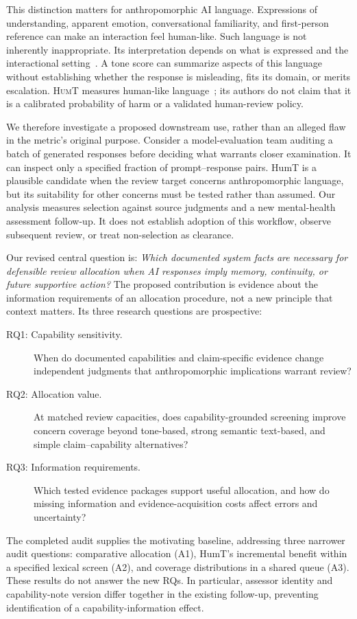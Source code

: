 \documentclass[manuscript,screen,review,anonymous]{acmart}
\newcommand{\HumT}{\textsc{HumT}}
\begin{document}
This distinction matters for anthropomorphic AI language. Expressions of understanding, apparent emotion, conversational familiarity, and first-person reference can make an interaction feel human-like. Such language is not inherently inappropriate. Its interpretation depends on what is expressed and the interactional setting~\cite{devrio2025taxonomy,cheng2025dehumanizing}. A tone score can summarize aspects of this language without establishing whether the response is misleading, fits its domain, or merits escalation. \HumT{} measures human-like language~\cite{cheng2025humt}; its authors do not claim that it is a calibrated probability of harm or a validated human-review policy.

We therefore investigate a proposed downstream use, rather than an alleged flaw in the metric's original purpose. Consider a model-evaluation team auditing a batch of generated responses before deciding what warrants closer examination. It can inspect only a specified fraction of prompt--response pairs. HumT is a plausible candidate when the review target concerns anthropomorphic language, but its suitability for other concerns must be tested rather than assumed. Our analysis measures selection against source judgments and a new mental-health assessment follow-up. It does not establish adoption of this workflow, observe subsequent review, or treat non-selection as clearance.

Our revised central question is: \emph{Which documented system facts are necessary for defensible review allocation when AI responses imply memory, continuity, or future supportive action?} The proposed contribution is evidence about the information requirements of an allocation procedure, not a new principle that context matters. Its three research questions are prospective:
\begin{description}
\item[RQ1: Capability sensitivity.] When do documented capabilities and claim-specific evidence change independent judgments that anthropomorphic implications warrant review?
\item[RQ2: Allocation value.] At matched review capacities, does capability-grounded screening improve concern coverage beyond tone-based, strong semantic text-based, and simple claim--capability alternatives?
\item[RQ3: Information requirements.] Which tested evidence packages support useful allocation, and how do missing information and evidence-acquisition costs affect errors and uncertainty?
\end{description}
The completed audit supplies the motivating baseline, addressing three narrower audit questions: comparative allocation (A1), HumT's incremental benefit within a specified lexical screen (A2), and coverage distributions in a shared queue (A3). These results do not answer the new RQs. In particular, assessor identity and capability-note version differ together in the existing follow-up, preventing identification of a capability-information effect.
\end{document}
